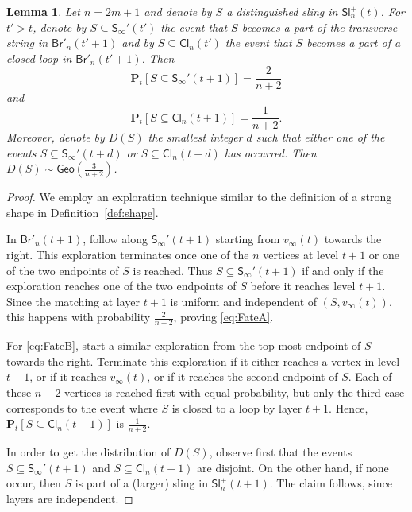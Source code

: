\documentclass[a4paper,11pt,reqno]{amsart}
\newcommand{\paul}[1]{\todo[color=yellow!70,inline]{Paul: #1}}
\newcommand{\fabian}[1]{\todo[color=red!50,inline]{Fabian: #1}}
\newcommand{\bP}{\mathbf{P}}
\newcommand{\Br}{\mathsf{Br}}
\newcommand{\Slr}{\mathsf{Sl}^+}
\newcommand{\Soo}{\mathsf{S}_\infty}
\newcommand{\Cl}{\mathsf{Cl}}
\newcommand{\Geo}{\mathsf{Geo}}
\newcommand{\ssq}{\subseteq}
\newtheorem{lemma}{Lemma}
\theoremstyle{definition}
\begin{document}
\begin{lemma}\label{lemma:SlFate}
Let $n=2m+1$ and denote by $S$ a distinguished sling in $\Slr_n(t)$. For $t'>t$, denote by $S\ssq \Soo'(t')$ the event that $S$ becomes a part of the transverse string in $\Br'_n(t'+1)$ and by $S\ssq \Cl_n(t')$ the event that $S$ becomes a part of a closed loop in $\Br'_n(t'+1)$. Then 
 \begin{equation}\label{eq:FateA}
  \bP_t[S\ssq\Soo'(t+1)]=\frac{2}{n+2}
 \end{equation}
 and 
 \begin{equation}\label{eq:FateB}
  \bP_t[S\ssq \Cl_n(t+1)]=\frac{1}{n+2}.
 \end{equation}
 Moreover, denote by $D(S)$ the smallest integer $d$ such that either one of the events $S\ssq\Soo'(t+d)$ or $S\ssq \Cl_n(t+d)$ has occurred. Then $D(S)\sim \Geo(\frac{3}{n+2})$. 
\end{lemma}



\begin{proof}
 We employ an exploration technique similar to the definition of a strong shape in Definition~\ref{def:shape}.
 
 In $\Br'_n(t+1)$, follow along $\Soo'(t+1)$ starting from $v_\infty(t)$ towards the right. This exploration terminates once one of the $n$ vertices at level $t+1$ or one of the two endpoints of $S$ is reached. Thus $S\ssq \Soo'(t+1)$ if and only if the exploration reaches one of the two endpoints of $S$ before it reaches level $t+1$. Since the matching at layer $t+1$ is uniform and independent of $(S,v_\infty(t))$, this happens with probability $\frac{2}{n+2}$, proving \eqref{eq:FateA}. 
 
 For \eqref{eq:FateB}, start a similar exploration from the top-most endpoint of $S$ towards the right. Terminate this exploration if it either reaches a vertex in level $t+1$, or if it reaches $v_\infty(t)$, or if it reaches the second endpoint of $S$. Each of these $n+2$ vertices is reached first with equal probability, but only the third case corresponds to the event where $S$ is closed to a loop by layer $t+1$. Hence, $\bP_t[S\ssq \Cl_n(t+1)]$ is $\frac{1}{n+2}$.
 
In order to get the distribution of $D(S)$, observe first that the events $S\ssq\Soo'(t+1)$ and $S\ssq\Cl_n(t+1)$ are disjoint. On the other hand, if none occur, then $S$ is part of a (larger) sling in $\Slr_n(t+1)$. The claim follows, since layers are independent. 
\end{proof}
\end{document}
